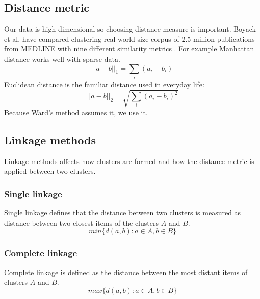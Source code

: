 \subsection{Distance metric}
Our data is high-dimensional so choosing distance measure is 
important. 
Boyack et al. have compared clustering real world size corpus of 
2.5 million publications from MEDLINE with nine different 
similarity metrics \cite{boyack_clustering_2011}.
For example Manhattan distance works well with sparse data.
\begin{equation}
 ||a-b||_1 = \sum_i{(a_i-b_i)}
\end{equation}
Euclidean distance is the familiar distance used in everyday life:
\begin{equation}
 ||a-b||_2 = \sqrt{\sum_i{(a_i-b_i)^2}}
\end{equation}
Because Ward's method assumes it, we use it.



\subsection{Linkage methods}


Linkage methods affects how clusters are formed and how the 
distance metric is applied between two clusters.

\subsubsection{Single linkage}
Single linkage defines that the distance between two clusters is 
measured as distance between two closest items of the clusters 
$A$ and $B$.
\begin{equation}
 min\{d(a,b):a \in A, b \in B\}
\end{equation}

\subsubsection{Complete linkage}
Complete linkage is defined as the distance between the most 
distant items of clusters $A$ and $B$.
\begin{equation}
 max\{d(a,b):a \in A, b \in B\}
\end{equation}

